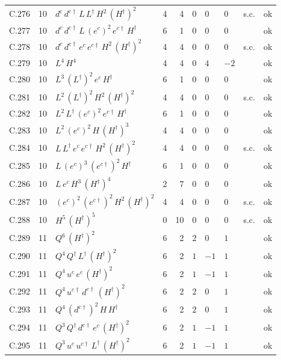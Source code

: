 {\begin{longtable}{@{}ll>{\raggedright\arraybackslash}p{6.4cm}rrllllr@{}}
C.276 & 10 & $d^c\,d^{c\dagger}\,L\,L^\dagger\,H^{2}\,(H^\dagger)^{2}$ & 4 & 4 & $0$ & $0$ & $0$ & s.c. & ok \\
C.277 & 10 & $d^c\,d^{c\dagger}\,L\,(e^c)^{2}\,e^{c\dagger}\,H^\dagger$ & 6 & 1 & $0$ & $0$ & $0$ &  & ok \\
C.278 & 10 & $d^c\,d^{c\dagger}\,e^c\,e^{c\dagger}\,H^{2}\,(H^\dagger)^{2}$ & 4 & 4 & $0$ & $0$ & $0$ & s.c. & ok \\
C.279 & 10 & $L^{4}\,H^{4}$ & 4 & 4 & $0$ & $4$ & $-2$ &  & ok \\
C.280 & 10 & $L^{3}\,(L^\dagger)^{2}\,e^c\,H^\dagger$ & 6 & 1 & $0$ & $0$ & $0$ &  & ok \\
C.281 & 10 & $L^{2}\,(L^\dagger)^{2}\,H^{2}\,(H^\dagger)^{2}$ & 4 & 4 & $0$ & $0$ & $0$ & s.c. & ok \\
C.282 & 10 & $L^{2}\,L^\dagger\,(e^c)^{2}\,e^{c\dagger}\,H^\dagger$ & 6 & 1 & $0$ & $0$ & $0$ &  & ok \\
C.283 & 10 & $L^{2}\,(e^c)^{2}\,H\,(H^\dagger)^{3}$ & 4 & 4 & $0$ & $0$ & $0$ &  & ok \\
C.284 & 10 & $L\,L^\dagger\,e^c\,e^{c\dagger}\,H^{2}\,(H^\dagger)^{2}$ & 4 & 4 & $0$ & $0$ & $0$ & s.c. & ok \\
C.285 & 10 & $L\,(e^c)^{3}\,(e^{c\dagger})^{2}\,H^\dagger$ & 6 & 1 & $0$ & $0$ & $0$ &  & ok \\
C.286 & 10 & $L\,e^c\,H^{3}\,(H^\dagger)^{4}$ & 2 & 7 & $0$ & $0$ & $0$ &  & ok \\
C.287 & 10 & $(e^c)^{2}\,(e^{c\dagger})^{2}\,H^{2}\,(H^\dagger)^{2}$ & 4 & 4 & $0$ & $0$ & $0$ & s.c. & ok \\
C.288 & 10 & $H^{5}\,(H^\dagger)^{5}$ & 0 & 10 & $0$ & $0$ & $0$ & s.c. & ok \\
C.289 & 11 & $Q^{6}\,(H^\dagger)^{2}$ & 6 & 2 & $2$ & $0$ & $1$ &  & ok \\
C.290 & 11 & $Q^{4}\,Q^\dagger\,L^\dagger\,(H^\dagger)^{2}$ & 6 & 2 & $1$ & $-1$ & $1$ &  & ok \\
C.291 & 11 & $Q^{4}\,u^c\,e^c\,(H^\dagger)^{2}$ & 6 & 2 & $1$ & $-1$ & $1$ &  & ok \\
C.292 & 11 & $Q^{4}\,u^{c\dagger}\,d^{c\dagger}\,(H^\dagger)^{2}$ & 6 & 2 & $2$ & $0$ & $1$ &  & ok \\
C.293 & 11 & $Q^{4}\,(d^{c\dagger})^{2}\,H\,H^\dagger$ & 6 & 2 & $2$ & $0$ & $1$ &  & ok \\
C.294 & 11 & $Q^{3}\,Q^\dagger\,d^{c\dagger}\,e^c\,(H^\dagger)^{2}$ & 6 & 2 & $1$ & $-1$ & $1$ &  & ok \\
C.295 & 11 & $Q^{3}\,u^c\,u^{c\dagger}\,L^\dagger\,(H^\dagger)^{2}$ & 6 & 2 & $1$ & $-1$ & $1$ &  & ok \\

\end{longtable}}
